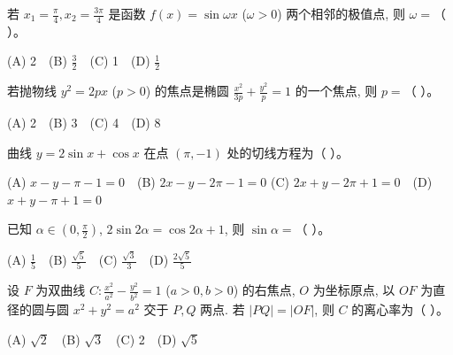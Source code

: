 \begin{question}
若 $x_1 = \frac{\pi}{4}, x_2 = \frac{3\pi}{4}$ 是函数 $f(x) = \sin\omega x$ ($\omega > 0$) 两个相邻的极值点, 则 $\omega =$（ ）。

(A) 2　(B) $\frac{3}{2}$　(C) 1　(D) $\frac{1}{2}$

\end{question}
\begin{question}
若抛物线 $y^2 = 2px$ ($p > 0$) 的焦点是椭圆 $\frac{x^2}{3p} + \frac{y^2}{p} = 1$ 的一个焦点, 则 $p =$（ ）。

(A) 2　(B) 3　(C) 4　(D) 8

\end{question}
\begin{question}
曲线 $y = 2\sin x + \cos x$ 在点 $(\pi, -1)$ 处的切线方程为（ ）。

(A) $x - y - \pi - 1 = 0$　(B) $2x - y - 2\pi - 1 = 0$
(C) $2x + y - 2\pi + 1 = 0$　(D) $x + y - \pi + 1 = 0$

\end{question}
\begin{question}
已知 $\alpha \in (0, \frac{\pi}{2})$, $2\sin 2\alpha = \cos 2\alpha + 1$, 则 $\sin\alpha =$（ ）。

(A) $\frac{1}{5}$　(B) $\frac{\sqrt{5}}{5}$　(C) $\frac{\sqrt{3}}{3}$　(D) $\frac{2\sqrt{5}}{5}$

\end{question}
\begin{question}
设 $F$ 为双曲线 $C: \frac{x^2}{a^2} - \frac{y^2}{b^2} = 1$ ($a > 0, b > 0$) 的右焦点, $O$ 为坐标原点, 以 $OF$ 为直径的圆与圆 $x^2 + y^2 = a^2$ 交于 $P, Q$ 两点. 若 $|PQ| = |OF|$, 则 $C$ 的离心率为（ ）。

(A) $\sqrt{2}$　(B) $\sqrt{3}$　(C) 2　(D) $\sqrt{5}$

\par\medskip

\end{question}

